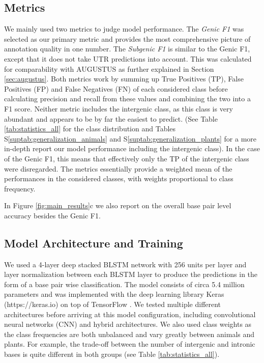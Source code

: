 \documentclass{bioinfo}
\newcounter{suptab}
\begin{document}
\begin{methods}
\subsection{Metrics}
\label{sec:metrics}
We mainly used two metrics to judge model performance. The {\it Genic F1} was selected as our 
primary metric and provides the most comprehensive picture of annotation quality 
in one number. The {\it Subgenic F1} is similar to the Genic F1, except that it does 
not take UTR predictions into account. This was calculated for comparability with AUGUSTUS 
as further explained in Section \ref{sec:augustus}. Both metrics work by summing up 
True Positives (TP), False Positives (FP) and False Negatives (FN) of each 
considered class before calculating precision and recall from these values and 
combining the two into a F1 score. Neither metric includes the
intergenic class, as this class is very abundant and appears to be by 
far the easiest to predict. (See Table \ref{tab:statistics_all} for the class 
distribution and Tables S\ref{suptab:generalization_animals} 
and S\ref{suptab:generalization_plants} for a more in-depth report our model performance 
including the intergenic class). In the case of the Genic F1, this means that 
effectively only the TP of the intergenic class were disregarded. The metrics 
essentially provide a weighted mean of the performances in the considered classes,
with weights proportional to class frequency.

In Figure \ref{fig:main_results}c we also report on the overall base pair level 
accuracy besides the Genic F1.

\subsection{Model Architecture and Training}
\label{sec:model}
We used a 4-layer deep stacked BLSTM network with 256 units per layer and layer 
normalization \citep{ba2016layer} between each BLSTM layer to produce the 
predictions in the form of a base pair wise classification. The model consists of 
circa 5.4 million parameters and was implemented with the deep learning library 
Keras (https://keras.io) on top of TensorFlow \citep{abadi2016tensorflow}. We 
tested multiple different architectures before arriving at this model configuration, 
including convolutional neural networks (CNN) and hybrid architectures. We also used 
class weights as the class frequencies are both unbalanced and 
vary greatly between animals and plants. 
For example, the trade-off between the number of intergenic and intronic bases is 
quite different in both groups (see Table \ref{tab:statistics_all}). 


\end{methods}
\end{document}
